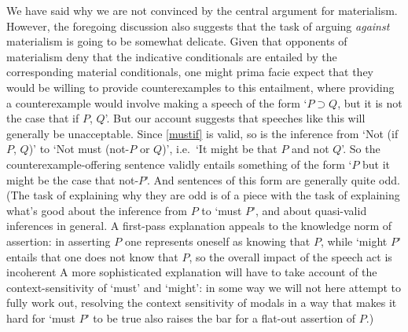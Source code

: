 \documentclass[If.tex]{subfiles}
\begin{document}
We have said why we are not convinced by the central argument for materialism.  However, the foregoing discussion also suggests that the task of arguing \emph{against} materialism is going to be somewhat delicate.  Given that opponents of materialism deny that the indicative conditionals are entailed by the corresponding material conditionals, one might prima facie expect that they would be willing to provide counterexamples to this entailment, where providing a counterexample would involve making a speech of the form ‘$P ⊃ Q$, but it is not the case that if $P$, $Q$’.  But our account suggests that speeches like this will generally be unacceptable.  Since \ref{mustif} is valid, so is the inference from ‘Not (if $P$, $Q$)’ to ‘Not must (not-$P$ or $Q$)’, i.e.\ ‘It might be that $P$ and not $Q$’.  So the counterexample-offering sentence validly entails something of the form ‘$P$ but it might be the case that not-$P$’.  And sentences of this form are generally quite odd.  (The task of explaining why they are odd is of a piece with the task of explaining what's good about the inference from $P$ to ‘must $P$’, and about quasi-valid inferences in general.  A first-pass explanation appeals to the knowledge norm of assertion: in asserting $P$ one represents oneself as knowing that $P$, while ‘might $P$’ entails that one does not know that $P$, so the overall impact of the speech act is incoherent  A more sophisticated explanation will have to take account of the context-sensitivity of ‘must’ and ‘might’: in some way we will not here attempt to fully work out, resolving the context sensitivity of modals in a way that makes it hard for ‘must $P$’ to be true also raises the bar for a flat-out assertion of $P$.)
\end{document}
